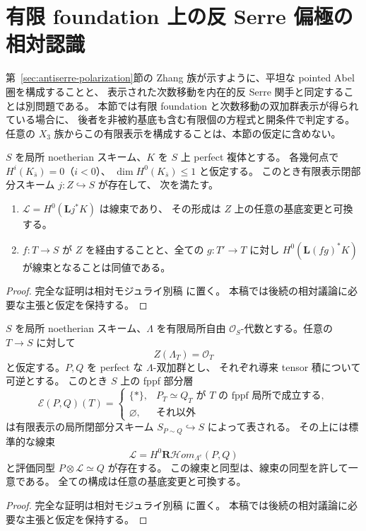 \section{有限 foundation 上の反 Serre 偏極の相対認識}
\label{sec:finite-polarization-recognition}

第~\ref{sec:antiserre-polarization}節の Zhang 族が示すように、平坦な pointed Abel 圏を構成することと、
表示された次数移動を内在的反 Serre 関手と同定することは別問題である。
本節では有限 foundation と次数移動の双加群表示が得られている場合に、
後者を非被約基底も含む有限個の方程式と開条件で判定する。
任意の $X_3$ 族からこの有限表示を構成することは、本節の仮定に含めない。

\begin{lemma}
\label{lem:lowest-hom-line-locus}
$S$ を局所 noetherian スキーム、$K$ を $S$ 上 perfect 複体とする。
各幾何点で $H^i(K_{\bar s})=0$（$i<0$）、
$\dim H^0(K_{\bar s})\le1$ と仮定する。
このとき有限表示閉部分スキーム $j:Z\hookrightarrow S$ が存在して、
次を満たす。
\begin{enumerate}
\item $\mathcal L=H^0(\mathbf L j^*K)$ は線束であり、
その形成は $Z$ 上の任意の基底変更と可換する。
\item $f:T\to S$ が $Z$ を経由することと、全ての
$g:T'\to T$ に対し $H^0(\mathbf L(fg)^*K)$ が線束となることは同値である。
\end{enumerate}
\end{lemma}
\begin{proof}
完全な証明は相対モジュライ別稿 \cite[有限 foundation 上の偏極認識]{QuadricModuli2026} に置く。
本稿では後続の相対議論に必要な主張と仮定を保持する。
\end{proof}

\begin{theorem}
\label{thm:bimodule-line-comparison}
$S$ を局所 noetherian スキーム、$\Lambda$ を有限局所自由
$\mathcal O_S$-代数とする。任意の $T\to S$ に対して
\[
 Z(\Lambda_T)=\mathcal O_T
\]
と仮定する。$P,Q$ を perfect な $\Lambda$-双加群とし、
それぞれ導来 tensor 積について可逆とする。
このとき $S$ 上の fppf 部分層
\[
 \mathscr E(P,Q)(T)=
 \begin{cases}
 \{*\},&P_T\simeq Q_T\text{ が }T\text{ の fppf 局所で成立する},\\
 \varnothing,&\text{それ以外}
 \end{cases}
\]
は有限表示の局所閉部分スキーム $S_{P\sim Q}\hookrightarrow S$ によって表される。
その上には標準的な線束
\[
 \mathcal L=H^0\mathbf R\mathcal Hom_{\Lambda^e}(P,Q)
\]
と評価同型 $P\otimes\mathcal L\simeq Q$ が存在する。
この線束と同型は、線束の同型を許して一意である。
全ての構成は任意の基底変更と可換する。
\end{theorem}
\begin{proof}
完全な証明は相対モジュライ別稿 \cite[有限 foundation 上の偏極認識]{QuadricModuli2026} に置く。
本稿では後続の相対議論に必要な主張と仮定を保持する。
\end{proof}

